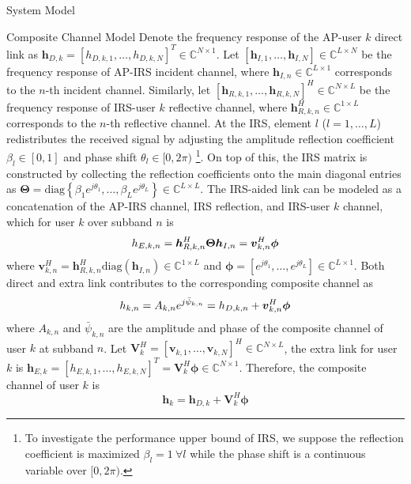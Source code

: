 \documentclass{IEEEtran}
\begin{document}
\begin{section}{System Model}
	\begin{subsection}{Composite Channel Model}
		Denote the frequency response of the AP-user $k$ direct link as $\boldsymbol{h}_{D,k}=[h_{D,k,1},\dots,h_{D,k,N}]^T \in \mathbb{C}^{N \times 1}$. Let $[\boldsymbol{h}_{I,1},\dots,\boldsymbol{h}_{I,N}] \in \mathbb{C}^{L \times N}$ be the frequency response of AP-IRS incident channel, where $\boldsymbol{h}_{I,n} \in \mathbb{C}^{L \times 1}$ corresponds to the $n$-th incident channel. Similarly, let $[\boldsymbol{h}_{R,k,1},\dots,\boldsymbol{h}_{R,k,N}]^H \in \mathbb{C}^{N \times L}$ be the frequency response of IRS-user $k$ reflective channel, where $\boldsymbol{h}_{R,k,n}^H \in \mathbb{C}^{1 \times L}$ corresponds to the $n$-th reflective channel. At the IRS, element $l$ ($l=1,\dots,L$) redistributes the received signal by adjusting the amplitude reflection coefficient $\beta_l \in [0,1]$ and phase shift $\theta_l \in [0,2\pi)$ \footnote{To investigate the performance upper bound of IRS, we suppose the reflection coefficient is maximized $\beta_l=1 \ \forall l$ while the phase shift is a continuous variable over $[0,2\pi)$.}. On top of this, the IRS matrix is constructed by collecting the reflection coefficients onto the main diagonal entries as $\boldsymbol{\Theta} = \mathrm{diag}\left\{\beta_1 e^{j \theta_1}, \dots, \beta_L e^{j \theta_L}\right\} \in \mathbb{C}^{L \times L}$. The IRS-aided link can be modeled as a concatenation of the AP-IRS channel, IRS reflection, and IRS-user $k$ channel, which for user $k$ over subband $n$ is
		\begin{equation}\label{eq:h_{E,k,n}}
			h_{E,k,n} = \boldsymbol{h}_{R,k,n}^H \boldsymbol{\Theta} \boldsymbol{h}_{I,n} = \boldsymbol{v}_{k,n}^H \boldsymbol{\phi}
		\end{equation}
		where $\boldsymbol{v}_{k,n}^H=\boldsymbol{h}_{R,k,n}^H \mathrm{diag}(\boldsymbol{h}_{I,n}) \in \mathbb{C}^{1 \times L}$ and $\boldsymbol{\phi}=[e^{j{\theta_1}},\dots,e^{j{\theta_L}}] \in \mathbb{C}^{L \times 1}$. Both direct and extra link contributes to the corresponding composite channel as
		\begin{equation}\label{eq:h_{k,n}}
			h_{k,n} = A_{k,n} e^{j\bar{\psi}_{k,n}}= h_{D,k,n} + \boldsymbol{v}_{k,n}^H \boldsymbol{\phi}
		\end{equation}
		where $A_{k,n}$ and $\bar{\psi}_{k,n}$ are the amplitude and phase of the composite channel of user $k$ at subband $n$. Let $\boldsymbol{V}_k^H=[\boldsymbol{v}_{k,1},\dots,\boldsymbol{v}_{k,N}]^H \in \mathbb{C}^{N \times L}$, the extra link for user $k$ is $\boldsymbol{h}_{E,k}=[h_{E,k,1},\dots,h_{E,k,N}]^T=\boldsymbol{V}_k^H \boldsymbol{\phi} \in \mathbb{C}^{N \times 1}$. Therefore, the composite channel of user $k$ is
		\begin{equation}\label{eq:h_k}
			\boldsymbol{h}_k = \boldsymbol{h}_{D,k} + \boldsymbol{V}_k^H \boldsymbol{\phi}
		\end{equation}
	\end{subsection}


\end{section}
\end{document}
